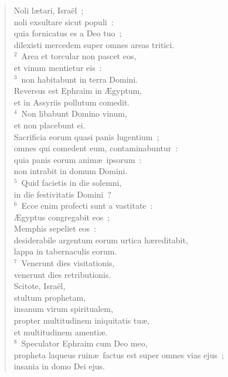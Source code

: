 \begin{flushleft}\begin{verse}\vspace{-19pt}Noli l\ae tari, Isra\"el~;\\ noli exsultare sicut populi~:\\ quia fornicatus es a Deo tuo~;\\ dilexisti mercedem super omnes areas tritici.\\
${}^{2}$~Area et torcular non pascet eos,\\ et vinum mentietur eis~:\\
${}^{3}$~non habitabunt in terra Domini.\\ Reversus est Ephraim in \AE gyptum,\\ et in Assyriis pollutum comedit.\\
${}^{4}$~Non libabunt Domino vinum,\\ et non placebunt ei.\\ Sacrificia eorum quasi panis lugentium~;\\ omnes qui comedent eum, contaminabuntur~:\\ quia panis eorum anim\ae\ ipsorum~:\\ non intrabit in domum Domini.\\
${}^{5}$~Quid facietis in die solemni,\\ in die festivitatis Domini~?\\
${}^{6}$~Ecce enim profecti sunt a vastitate~:\\ \AE gyptus congregabit eos~;\\ Memphis sepeliet eos~:\\ desiderabile argentum eorum urtica h\ae reditabit,\\ lappa in tabernaculis eorum.\\
${}^{7}$~Venerunt dies visitationis,\\ venerunt dies retributionis.\\ Scitote, Isra\"el,\\ stultum prophetam,\\ insanum virum spiritualem,\\ propter multitudinem iniquitatis tu\ae ,\\ et multitudinem amenti\ae .\\
${}^{8}$~Speculator Ephraim cum Deo meo,\\ propheta laqueus ruin\ae\ factus est super omnes vias ejus~;\\ insania in domo Dei ejus.\\

\end{verse}
\end{flushleft}
